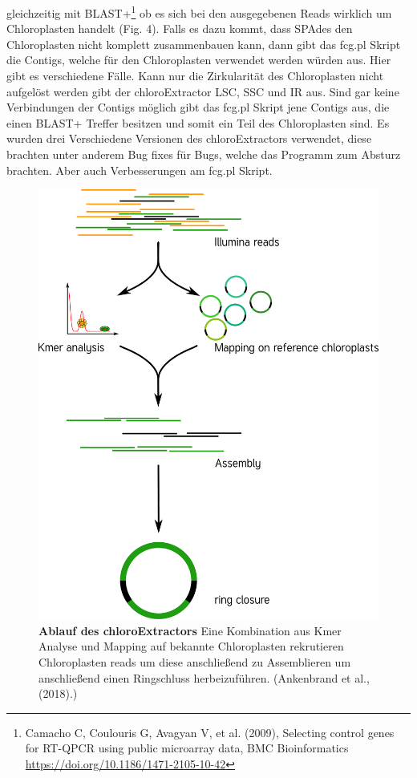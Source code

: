 \documentclass{scrartcl}
\begin{document}
gleichzeitig mit BLAST+\footnote{Camacho C, Coulouris G, Avagyan V, et al. (2009), Selecting control genes for RT-QPCR using public microarray data, BMC Bioinformatics \url{https://doi.org/10.1186/1471-2105-10-42}} ob es sich bei den ausgegebenen Reads wirklich um Chloroplasten handelt (Fig. 4). Falls es dazu kommt,
dass SPAdes den Chloroplasten nicht komplett zusammenbauen kann, dann gibt das fcg.pl Skript die Contigs, welche für den Chloroplasten verwendet werden würden aus. Hier gibt es verschiedene Fälle. Kann nur die Zirkularität 
des Chloroplasten nicht aufgelöst werden gibt der chloroExtractor LSC, SSC und IR aus. Sind gar keine Verbindungen der Contigs möglich gibt das fcg.pl Skript jene Contigs aus, die einen BLAST+ Treffer besitzen und somit ein
Teil des Chloroplasten sind.  Es wurden drei Verschiedene Versionen des chloroExtractors verwendet, diese brachten unter anderem Bug fixes für Bugs, welche das 
Programm zum Absturz brachten. Aber auch Verbesserungen am fcg.pl Skript.

\begin{figure}
\includegraphics[width=.9\linewidth]{./workflow.png}
\caption[Ablauf des chloroExtractors]{\textbf{Ablauf des chloroExtractors} Eine Kombination aus Kmer Analyse und Mapping auf bekannte Chloroplasten rekrutieren Chloroplasten reads um diese anschließend zu Assemblieren um anschließend einen Ringschluss herbeizuführen. (Ankenbrand et al., (2018).)}
\end{figure}
\end{document}
